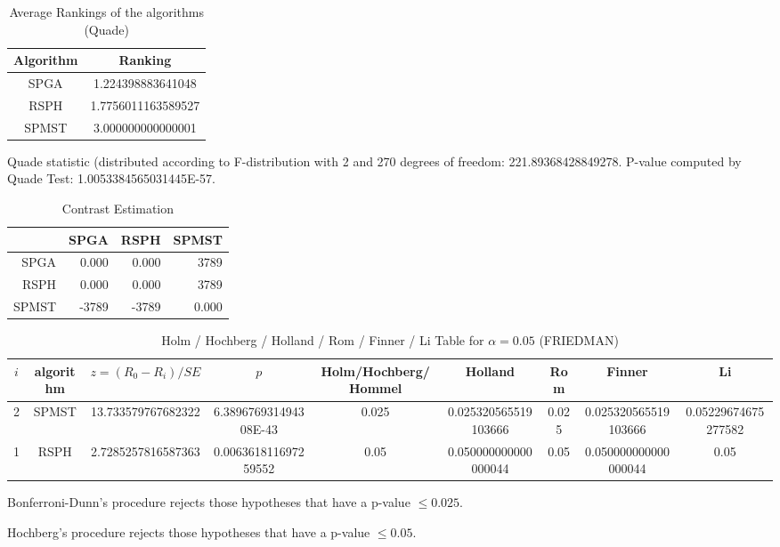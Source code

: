 \documentclass[a4paper,10pt]{article}
\begin{document}
\begin{landscape}
\begin{table}[!htp]
\centering
\caption{Average Rankings of the algorithms (Quade)
}\begin{tabular}{c|c}
Algorithm&Ranking\\
\hline
SPGA&1.224398883641048\\
RSPH&1.7756011163589527\\
SPMST&3.000000000000001\\
\end{tabular}
\end{table}
Quade statistic (distributed according to F-distribution with 2 and 270 degrees of freedom: 221.89368428849278. 
P-value computed by Quade Test: 1.0053384565031445E-57.\newline


\newpage

\begin{table}[!htp]
\centering\tiny
\caption{Contrast Estimation}
\begin{tabular}{
|r|r|r|r|}
\hline
 &SPGA&RSPH&SPMST\\
\hline
SPGA&0.000&0.000&3789\\
\hline
RSPH&0.000&0.000&3789\\
\hline
SPMST&-3789&-3789&0.000\\
\hline

\end{tabular}
\end{table}

\newpage

\begin{table}[!htp]
\centering\scriptsize
\caption{Holm / Hochberg / Holland / Rom / Finner / Li Table for $\alpha=0.05$ (FRIEDMAN)}
\begin{tabular}{ccccccccc}
$i$&algorithm&$z=(R_0 - R_i)/SE$&$p$&Holm/Hochberg/Hommel&Holland&Rom&Finner&Li\\
\hline
2&SPMST&13.733579767682322&6.389676931494308E-43&0.025&0.025320565519103666&0.025&0.025320565519103666&0.05229674675277582\\
1&RSPH&2.7285257816587363&0.006361811697259552&0.05&0.050000000000000044&0.05&0.050000000000000044&0.05\\
\hline
\end{tabular}
\end{table}
Bonferroni-Dunn's procedure rejects those hypotheses that have a p-value $\le0.025$.


Hochberg's procedure rejects those hypotheses that have a p-value $\le0.05$.



\end{landscape}
\end{document}
